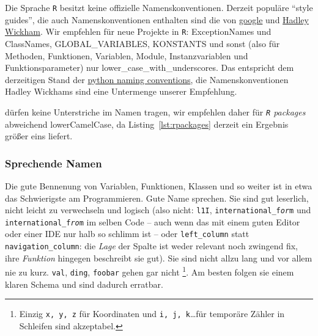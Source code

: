 \documentclass[twoside]{scrartcl}
\providecommand{\R}{\texttt{R}}
\providecommand{\code}[1]{\texttt{#1}}
\begin{document}
Die Sprache \R{} besitzt keine offizielle Namenskonventionen. Derzeit
popul\"a{}re "`style guides"', die auch Namenskonventionen enthalten sind die
von
\href{https://google-styleguide.googlecode.com/svn/trunk/Rguide.xml}{google} und
\href{http://adv-r.had.co.nz/Style.html}{Hadley Wickham}.
Wir empfehlen f\"u{}r neue Projekte in \R{}: 
ExceptionNames und ClassNames, GLOBAL\_VARIABLES, KONSTANTS und sonst (also
f\"u{}r Methoden, Funktionen, Variablen, Module, Instanzvariablen und
Funktionsparameter) nur lower\_case\_with\_underscores.
Das entspricht dem derzeitigen Stand der
\href{http://legacy.python.org/dev/peps/pep-0008/#naming-conventions}{python
  naming conventions}, die Namenskonventionen Hadley Wickhams sind eine
  Untermenge unserer Empfehlung.

 d\"urfen keine Unterstriche im Namen tragen, wir
empfehlen daher f\"u{}r \emph{\R{} packages} abweichend lowerCamelCase, 
da Listing~\ref{lst:rpackages} derzeit ein Ergebnis gr\"o{}\ss{}er eins 
liefert.


\subsubsection{Sprechende Namen}
Die gute Bennenung von Variablen, Funktionen, Klassen und so weiter ist in etwa
das Schwierigste am Programmieren. Gute Name sprechen. Sie sind gut leserlich,
nicht leicht zu verwechseln und logisch (also nicht: \code{l1I},
\code{international\_f\emph{or}m} und \code{international\_f\emph{ro}m} im 
selben Code -- auch wenn das mit einem guten Editor oder einer IDE nur halb so 
schlimm ist -- oder \code{left\_column} statt \code{navigation\_column}: die 
\emph{Lage} der Spalte ist weder relevant noch zwingend fix, ihre 
\emph{Funktion} hingegen beschreibt sie gut).
Sie sind nicht allzu lang und vor allem nie zu kurz.
\code{val}, \code{ding}, \code{foobar} gehen gar nicht%
\footnote{Einzig \code{x, y, z} f\"ur Koordinaten
  und \code{i, j, k}\ldots f\"ur tempor\"a{}re Z\"a{}hler in Schleifen sind
  akzeptabel.}.
Am besten folgen sie einem klaren Schema und sind dadurch erratbar.
\end{document}
